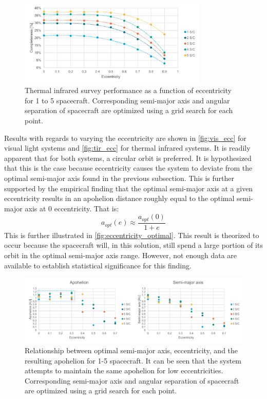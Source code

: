 \begin{figure}[htbp]
 \centering
 \includegraphics[width=0.8\textwidth]{img/tir_ecc.pdf}
 \caption{Thermal infrared survey performance as a function of eccentricity for 1 to 5 spacecraft. Corresponding semi-major axis and angular separation of spacecraft are optimized using a grid search for each point.}
 \label{fig:tir_ecc}
\end{figure}

Results with regards to varying the eccentricity are shown in \autoref{fig:vis_ecc} for visual light systems and \autoref{fig:tir_ecc} for thermal infrared systems. It is readily apparent that for both systems, a circular orbit is preferred. It is hypothesized that this is the case because eccentricity causes the system to deviate from the optimal semi-major axis found in the previous subsection. This is further supported by the empirical finding that the optimal semi-major axis at a given eccentricity results in an apohelion distance roughly equal to the optimal semi-major axis at 0 eccentricity. That is:
\begin{equation}
 a_{opt}(e) \approx \frac{a_{opt}(0)}{1+e}
\end{equation}
This is further illustrated in \autoref{fig:eccentricity_optimal}. This result is theorized to occur because the spacecraft will, in this solution, still spend a large portion of its orbit in the optimal semi-major axis range. However, not enough data are available to establish statistical significance for this finding.

\begin{figure}[htbp]
 \centering
 \includegraphics[width=1.0\textwidth]{img/eccentricity_optimal.pdf}
 \caption{Relationship between optimal semi-major axis, eccentricity, and the resulting apohelion for 1-5 spacecraft. It can be seen that the system attempts to maintain the same apohelion for low eccentricities. Corresponding semi-major axis and angular separation of spacecraft are optimized using a grid search for each point.}
 \label{fig:eccentricity_optimal}
\end{figure}


